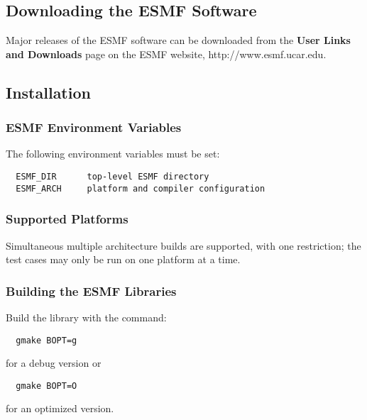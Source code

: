 
\subsection{Downloading the ESMF Software}

Major releases of the ESMF software can be downloaded from the {\bf User Links and
Downloads} page on the ESMF website, 
{http://www.esmf.ucar.edu}.  

\subsection{Installation}
\label{InstallProcedures}



\subsubsection{ESMF Environment Variables}

The following environment variables must be set:
\begin{verbatim}
  ESMF_DIR      top-level ESMF directory
  ESMF_ARCH     platform and compiler configuration
\end{verbatim}

\subsubsection{Supported Platforms}




Simultaneous multiple architecture builds are supported, with
one restriction; the test cases may only be run on one platform at a time. 

\subsubsection{Building the ESMF Libraries}
\label{BuildESMF}

Build the library with the command:
\begin{verbatim}
  gmake BOPT=g  
\end{verbatim}
  for a debug version or
\begin{verbatim}
  gmake BOPT=O  
\end{verbatim}
  for an optimized version.

